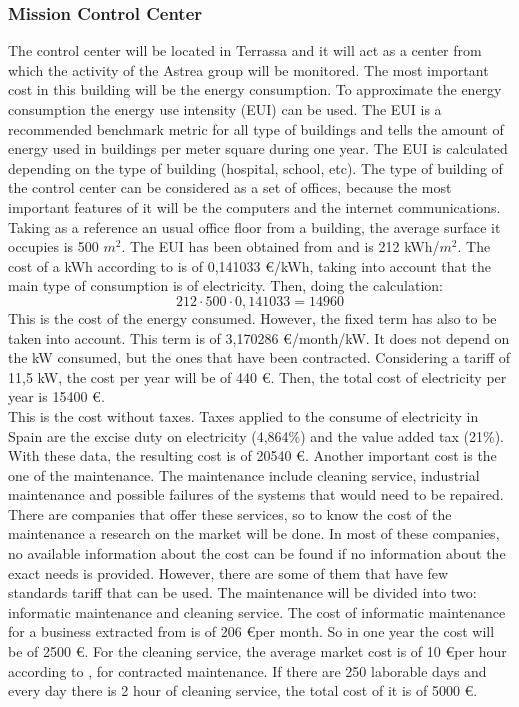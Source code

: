 \subsubsection{Mission Control Center}
The control center will be located in Terrassa and it will act as a center from which the activity of the Astrea group will be monitored. The most important cost in this building will be the energy consumption. To approximate the energy consumption the energy use intensity (EUI) can be used. The EUI is a recommended benchmark metric for all type of buildings and tells the amount of energy used in buildings per meter square during one year. The EUI is calculated depending on the type of building (hospital, school, etc). The type of building of the control center can be considered as a set of offices, because the most important features of it will be the computers and the internet communications. Taking as a reference an usual office floor from a building, the average surface it occupies is 500 $m^2$. The EUI has been obtained from \cite{EUI} and is 212 kWh/$m^2$. The cost of a kWh according to \cite{endesa} is of 0,141033 \euro /kWh, taking into account that the main type of consumption is of electricity. Then, doing the calculation: 
\begin{equation}
212 \cdot 500 \cdot 0,141033 = 14960
\end{equation} 
This is the cost of the energy consumed. However, the fixed term has also to be taken into account. This term is of 3,170286 \euro /month/kW. It does not depend on the kW consumed, but the ones that have been contracted. Considering a tariff of 11,5 kW, the cost per year will be of 440 \euro. Then, the total cost of electricity per year is 15400 \euro.\\ This is the cost without taxes. Taxes applied to the consume of electricity in Spain are the excise duty on electricity (4,864\%) and the value added tax (21\%). With these data, the resulting cost is of 20540 \euro. 
Another important cost is the one of the maintenance. The maintenance include cleaning service, industrial maintenance and possible failures of the systems that would need to be repaired. There are companies that offer these services, so to know the cost of the maintenance a research on the market will be done. In most of these companies, no available information about the cost can be found if no information about the exact needs is provided. However, there are some of them that have few standards tariff that can be used. The maintenance will be divided into two: informatic maintenance and cleaning service. The cost of informatic maintenance for a business extracted from \cite{inf} is of 206 \euro per month. So in one year the cost will be of 2500 \euro. For the cleaning service, the average market cost is of 10 \euro per hour according to \cite{clean}, for contracted maintenance. If there are 250 laborable days and every day there is 2 hour of cleaning service, the total cost of it is of 5000 \euro. \\

